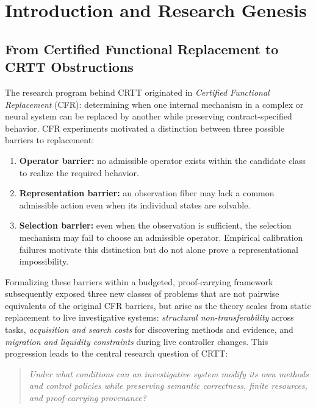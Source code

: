 \section{Introduction and Research Genesis}
\label{sec:intro}

\subsection{From Certified Functional Replacement to CRTT Obstructions}
The research program behind CRTT originated in \emph{Certified Functional Replacement} (CFR): determining when one internal mechanism in a complex or neural system can be replaced by another while preserving contract-specified behavior. CFR experiments motivated a distinction between three possible barriers to replacement:
\begin{enumerate}
    \item \textbf{Operator barrier:} no admissible operator exists within the candidate class to realize the required behavior.
    \item \textbf{Representation barrier:} an observation fiber may lack a common admissible action even when its individual states are solvable.
    \item \textbf{Selection barrier:} even when the observation is sufficient, the selection mechanism may fail to choose an admissible operator. Empirical calibration failures motivate this distinction but do not alone prove a representational impossibility.
\end{enumerate}

Formalizing these barriers within a budgeted, proof-carrying framework subsequently exposed three new classes of problems that are not pairwise equivalents of the original CFR barriers, but arise as the theory scales from static replacement to live investigative systems: \emph{structural non-transferability} across tasks, \emph{acquisition and search costs} for discovering methods and evidence, and \emph{migration and liquidity constraints} during live controller changes. This progression leads to the central research question of CRTT:
\begin{quote}
\emph{Under what conditions can an investigative system modify its own methods and control policies while preserving semantic correctness, finite resources, and proof-carrying provenance?}
\end{quote}

